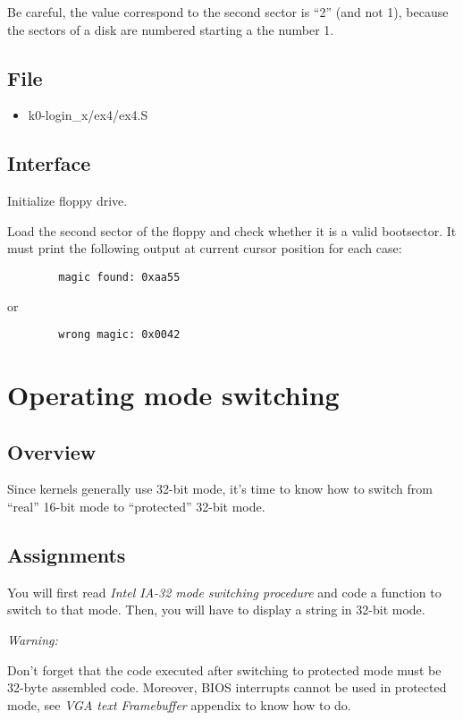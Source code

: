 Be careful, the value correspond to the second sector is ``2'' (and not 1), because
the sectors of a disk are numbered starting a the number 1.

\subsection*{File}
\begin{itemize}
  \item k0-login\_x/ex4/ex4.S
\end{itemize}

\subsection*{Interface}
{
  Initialize floppy drive.
}

{
  Load the second sector of the floppy and check whether it is a valid
  bootsector. It must print the following output at current cursor
  position for each case:
}
\begin{verbatim}
        magic found: 0xaa55
\end{verbatim}
\function{}{} {
or
}
\begin{verbatim}
        wrong magic: 0x0042
\end{verbatim}


%
%

\newpage

\section{Operating mode switching}

\subsection*{Overview}
Since kernels generally use 32-bit mode, it's time to know how to switch from
``real'' 16-bit mode to ``protected'' 32-bit mode.

\subsection*{Assignments}
You will first read \emph{Intel IA-32 mode switching procedure} and code a
function to switch to that mode. Then, you will have to display a string in
32-bit mode.

{\em Warning:}

Don't forget that the code executed after switching to protected mode must be
32-byte assembled code. Moreover, BIOS interrupts cannot be used in protected
mode, see \emph{VGA text Framebuffer} appendix to know how to do.

